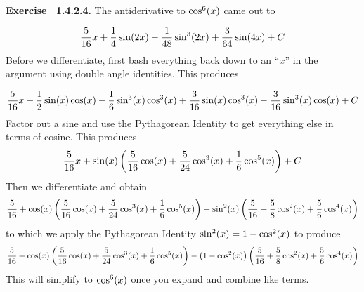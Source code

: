  {\noindent \protect \bf  Exercise ~1.4.2.4.} The antiderivative to $\protect \qopname  \relax o{cos}^6(x)$ came out to \par $$\protect \frac  {5}{16}x+\protect \frac  {1}{4}\protect \qopname  \relax o{sin}(2x)-\protect \frac  {1}{48}\protect \qopname  \relax o{sin}^3(2x)+\protect \frac  {3}{64}\protect \qopname  \relax o{sin}(4x)+C$$ Before we differentiate, first bash everything back down to an ``$x$'' in the argument using double angle identities. This produces \par $$\protect \frac  {5}{16}x+\protect \frac  {1}{2}\protect \qopname  \relax o{sin}(x)\protect \qopname  \relax o{cos}(x)-\protect \frac  {1}{6}\protect \qopname  \relax o{sin}^3(x)\protect \qopname  \relax o{cos}^3(x)+\protect \frac  {3}{16}\protect \qopname  \relax o{sin}(x)\protect \qopname  \relax o{cos}^3(x)-\protect \frac  {3}{16}\protect \qopname  \relax o{sin}^3(x)\protect \qopname  \relax o{cos}(x)+C$$ Factor out a sine and use the Pythagorean Identity to get everything else in terms of cosine. This produces $$\protect \frac  {5}{16}x+\protect \qopname  \relax o{sin}(x)\left (\protect \frac  {5}{16}\protect \qopname  \relax o{cos}(x)+\protect \frac  {5}{24}\protect \qopname  \relax o{cos}^3(x)+\protect \frac  {1}{6}\protect \qopname  \relax o{cos}^5(x)\right )+C$$ Then we differentiate and obtain $$\protect \frac  {5}{16}+\protect \qopname  \relax o{cos}(x)\left (\protect \frac  {5}{16}\protect \qopname  \relax o{cos}(x)+\protect \frac  {5}{24}\protect \qopname  \relax o{cos}^3(x)+\protect \frac  {1}{6}\protect \qopname  \relax o{cos}^5(x)\right )-\protect \qopname  \relax o{sin}^2(x)\left (\protect \frac  {5}{16}+\protect \frac  {5}{8}\protect \qopname  \relax o{cos}^2(x)+\protect \frac  {5}{6}\protect \qopname  \relax o{cos}^4(x)\right )$$ to which we apply the Pythagorean Identity $\protect \qopname  \relax o{sin}^2(x)=1-\protect \qopname  \relax o{cos}^2(x)$ to produce $$\protect \frac  {5}{16}+\protect \qopname  \relax o{cos}(x)\left (\protect \frac  {5}{16}\protect \qopname  \relax o{cos}(x)+\protect \frac  {5}{24}\protect \qopname  \relax o{cos}^3(x)+\protect \frac  {1}{6}\protect \qopname  \relax o{cos}^5(x)\right )-\left (1-\protect \qopname  \relax o{cos}^2(x)\right )\left (\protect \frac  {5}{16}+\protect \frac  {5}{8}\protect \qopname  \relax o{cos}^2(x)+\protect \frac  {5}{6}\protect \qopname  \relax o{cos}^4(x)\right )$$ This will simplify to $\protect \qopname  \relax o{cos}^6(x)$ once you expand and combine like terms.  \protect \newline  \protect \newline  
